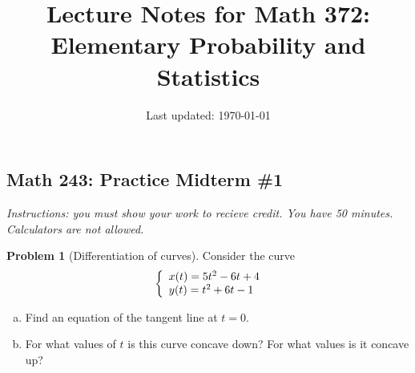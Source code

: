 \documentclass[10pt]{article}
\title{Lecture Notes for Math 372: \\Elementary Probability and Statistics}
\date{Last updated: \today}
\theoremstyle{definition}
\newtheorem{problem}[theorem]{Problem}
\newcommand{\1}[1]{\textbf{1}_{\left[#1\right]}} %
\begin{document}
  
  



\begin{center}
  \section*{Math 243: Practice Midterm \#1}
\end{center}

\textit{Instructions: you must show your work to recieve credit. You have 50
  minutes. Calculators are not allowed.}

\begin{problem}[Differentiation of curves]
  Consider the curve
  \begin{equation*}
    \left\{ \begin{array}{l@{}l} x(t) = 5t^{2}-6t+4 \\y(t)= t^{2}+6t-1 \end{array}\right.
  \end{equation*}
  \begin{enumerate}[(a)]
    \item Find an equation of the tangent line at $t=0$.
    \item For what values of $t$ is this curve concave down? For what values is it concave up?
  \end{enumerate}
\end{problem}
\end{document}
